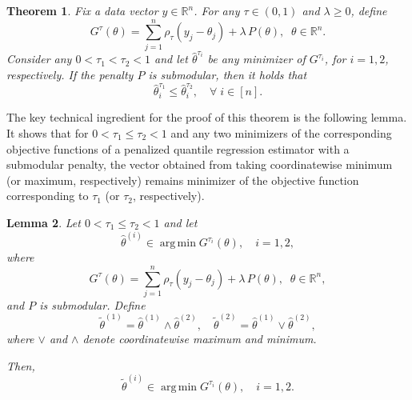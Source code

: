 \documentclass[11pt]{article}
\newcommand{\bR}{\mathbb{R}}
\DeclareMathOperator*{\argmin}{arg\,min}
\theoremstyle{plain}
\newtheorem{theorem}{Theorem}[section]
\newtheorem{lemma}[theorem]{Lemma}
\theoremstyle{definition}
\theoremstyle{remark}
\begin{document}
 \begin{theorem}\label{thm:submodular_non_crossing}
     Fix a data vector $y\in \bR^n$. For any $\tau \in (0,1)$ and $\lambda\geq 0$, define
     \[G^{\tau}(\theta)=\sum_{j=1}^n \rho_{\tau}(y_j-\theta_j)+\lambda\,P(\theta),\;\;\theta \in \bR^n.\]
     Consider any $0<\tau_1<\tau_2<1$ and let $\hat{\theta}^{\tau_i}$ be \textit{any} minimizer of $G^{\tau_i}$, for $i=1,2$, respectively. If the penalty $P$ is submodular, then it holds that
     \[\hat{\theta}^{\tau_1}_i\leq \hat{\theta}^{\tau_2}_i,\quad \forall\;i\in [n].\]
 \end{theorem}

The key technical ingredient for the proof of this theorem is the following lemma. It shows that for $0<\tau_1\leq \tau_2<1$ and any two minimizers of the corresponding objective functions of a penalized quantile regression estimator with a submodular penalty, the vector obtained from taking coordinatewise minimum (or maximum, respectively) remains minimizer of the objective function corresponding to $\tau_1$ (or \(\tau_2\), respectively).
 \begin{lemma}\label{lemma:minmax_preserves_qtltvd}
  Let $0<\tau_1 \leq \tau_2<1$ and let
\[
\hat{\theta}^{(i)} \in \argmin G^{\tau_i}(\theta),\quad i=1,2, 
\]
where
 \[G^{\tau}(\theta)=\sum_{j=1}^n \rho_{\tau}(y_j-\theta_j)+\lambda\,P(\theta),\;\;\theta \in \bR^n,\]
 and $P$ is submodular.
Define
\[
\tilde{\theta}^{(1)} = \hat{\theta}^{(1)} \wedge \hat{\theta}^{(2)},\quad\tilde{\theta}^{(2)} = \hat{\theta}^{(1)} \vee \hat{\theta}^{(2)},
\]
where $\vee$ and $\wedge$ denote coordinatewise maximum and minimum.

Then,
\[
\tilde{\theta}^{(i)} \in \argmin G^{\tau_i}(\theta),\quad i=1,2.
\]
 \end{lemma}
\end{document}
